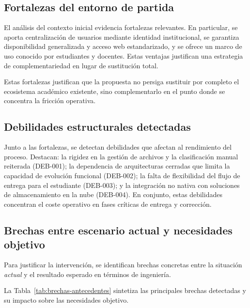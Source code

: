 \subsection{Fortalezas del entorno de partida}

El an\'alisis del contexto inicial evidencia fortalezas relevantes. En particular, se aporta centralizaci\'on de usuarios mediante identidad institucional, se garantiza disponibilidad generalizada y acceso web estandarizado, y se ofrece un marco de uso conocido por estudiantes y docentes. Estas ventajas justifican una estrategia de complementariedad en lugar de sustituci\'on total.

Estas fortalezas justifican que la propuesta no persiga sustituir por completo
el ecosistema acad\'emico existente,
sino complementarlo en el punto donde se concentra la fricci\'on operativa.

\subsection{Debilidades estructurales detectadas}

Junto a las fortalezas, se detectan debilidades que afectan al rendimiento del proceso. Destacan: la rigidez en la gesti\'on de archivos y la clasificaci\'on manual reiterada (DEB-001); la dependencia de arquitecturas cerradas que limita la capacidad de evoluci\'on funcional (DEB-002); la falta de flexibilidad del flujo de entrega para el estudiante (DEB-003); y la integraci\'on no nativa con soluciones de almacenamiento en la nube (DEB-004). En conjunto, estas debilidades concentran el coste operativo en fases cr\'iticas de entrega y correcci\'on.

\subsection{Brechas entre escenario actual y necesidades objetivo}

Para justificar la intervenci\'on, se identifican brechas concretas entre la situaci\'on \emph{actual} y el resultado esperado en t\'erminos de ingenier\'ia.

La Tabla~\ref{tab:brechas-antecedentes} sintetiza las principales brechas detectadas y su impacto sobre las necesidades objetivo.

